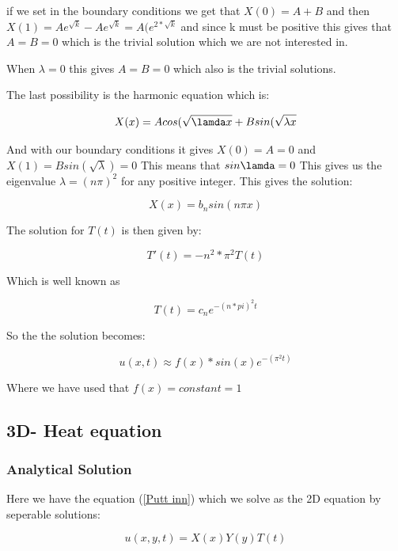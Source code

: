 \documentclass[a4paper,10pt]{article}
\begin{document}
if we set in the boundary conditions we get that $X(0) = A+B$ and then $X(1) = Ae^{\sqrt{k}} - Ae^{\sqrt{k}} = A(e^{2*\sqrt{k}}$ and since k must
be positive this gives that $A=B=0$ which is the trivial solution which we are not interested in.

When $\lambda = 0 $ this gives $A=B=0$ which also is the trivial solutions.

The last possibility is the harmonic equation which is:

\begin{equation}

 X(x) = Acos(\sqrt{\lamda x} + Bsin(\sqrt{\lambda x}
\end{equation}

And with our boundary conditions it gives $X(0) = A = 0$ and $X(1) = Bsin(\sqrt{\lambda}) = 0$
This means that $sin\lamda = 0$ This gives us the eigenvalue $\lambda = (n\pi)^2$ for any positive integer.
This gives the solution:

\begin{equation}
 X(x) = b_nsin(n\pi x)
\end{equation}

The solution for $T(t)$ is then given by:

\begin{equation}
 T'(t) = -n^2*\pi ^2 T(t)
\end{equation}

Which is well known as 

\begin{equation}
 T(t) = c_ne^{-(n*pi)^2t}
\end{equation}

So the the solution becomes:

\begin{equation}
 u(x,t) \approx f(x)*sin(x)e^{-(\pi^2t)}
 \end{equation}

 Where we have used that $f(x) = constant = 1$
 
 \subsection{3D- Heat equation}
\subsubsection{Analytical Solution}
Here we have the equation (\ref{Putt inn}) which we solve as the 2D equation by seperable solutions:

\begin{equation}
 u(x,y,t) = X(x)Y(y)T(t)
\end{equation}
\end{document}
